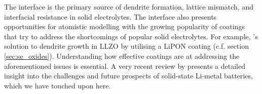 \documentclass[../main.tex]{subfiles}
\begin{document}
The interface is the primary source of dendrite formation, lattice mismatch, and interfacial resistance in solid electrolytes. The interface also presents opportunities for atomistic modelling with the growing popularity of coatings that try to address the shortcomings of popular solid electrolytes.\cite{Kim2020, Xu2018exp, Chen2020se_coat, Ito2017, Yin2020, Ji2020coating, Li2020coating, Yi2021coating, Dai2021coating, Pan2020coating, Jing2020coating, Wang2021coating, Zhao2020coating, Zhao2021coating, Liang2020coating, Zhang2020coating} For example, \citeauthor{Tian2018}'s solution to dendrite growth in LLZO by utilising a LiPON coating\cite{Tian2018} (c.f. section \ref{sec:se_oxides}). Understanding how effective coatings are at addressing the aforementioned issues is essential. \cite{Zhang2020directvis, Xiao2019coat, Tian2018} A very recent review by \citeauthor{kim2021solid} presents a detailed insight into the challenges and future prospects of solid-state Li-metal batteries, which we have touched upon here.\cite{kim2021solid}
\end{document}

